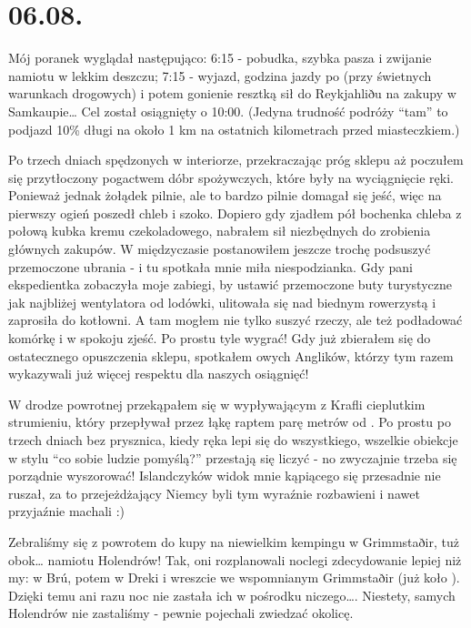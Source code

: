 \chapter*{06.08.}

Mój poranek wyglądał następująco: 6:15 - pobudka, szybka pasza i zwijanie namiotu w lekkim deszczu; 7:15 - wyjazd, godzina jazdy po  (przy świetnych warunkach drogowych) i potem gonienie resztką sił do Reykjahliðu na zakupy w Samkaupie… Cel został osiągnięty o 10:00. (Jedyna trudność podróży “tam” to podjazd 10\% długi na około 1 km na ostatnich kilometrach przed miasteczkiem.)

Po trzech dniach spędzonych w interiorze, przekraczając próg sklepu aż poczułem się przytłoczony pogactwem dóbr spożywczych, które były na wyciągnięcie ręki. Ponieważ jednak żołądek pilnie, ale to bardzo pilnie domagał się jeść, więc na pierwszy ogień poszedł chleb i szoko. Dopiero gdy zjadłem pół bochenka chleba z połową kubka kremu czekoladowego, nabrałem sił niezbędnych do zrobienia głównych zakupów. W międzyczasie postanowiłem jeszcze trochę podsuszyć przemoczone ubrania - i tu spotkała mnie miła niespodzianka. Gdy pani ekspedientka zobaczyła moje zabiegi, by ustawić przemoczone buty turystyczne jak najbliżej wentylatora od lodówki, ulitowała się nad biednym rowerzystą i zaprosiła do kotłowni. A tam mogłem nie tylko suszyć rzeczy, ale też podładować komórkę i w spokoju zjeść. Po prostu tyle wygrać! Gdy już zbierałem się do ostatecznego opuszczenia sklepu, spotkałem owych Anglików, którzy tym razem wykazywali już więcej respektu dla naszych osiągnięć!

W drodze powrotnej przekąpałem się w wypływającym z Krafli cieplutkim strumieniu, który przepływał przez łąkę raptem parę metrów od . Po prostu po trzech dniach bez prysznica, kiedy ręka lepi się do wszystkiego, wszelkie obiekcje w stylu “co sobie ludzie pomyślą?” przestają się liczyć - no zwyczajnie trzeba się porządnie wyszorować! Islandczyków widok mnie kąpiącego się przesadnie nie ruszał, za to przejeżdżający Niemcy byli tym wyraźnie rozbawieni i nawet przyjaźnie machali :)

Zebraliśmy się z powrotem do kupy na niewielkim kempingu w Grimmstaðir, tuż obok… namiotu Holendrów! Tak, oni rozplanowali noclegi zdecydowanie lepiej niż my: w Brú, potem w Dreki i wreszcie we wspomnianym Grimmstaðir (już koło ). Dzięki temu ani razu noc nie zastała ich w pośrodku niczego…. Niestety, samych Holendrów nie zastaliśmy - pewnie pojechali zwiedzać okolicę.

